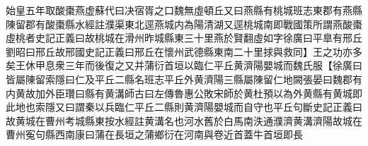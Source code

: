 始皇五年取酸棗燕虚蘇代曰决宿胥之口魏無虛頓丘又曰燕縣有桃城班志東郡有燕縣陳留郡有酸棗縣水經註濮渠東北逕燕城内為陽清湖又逕桃城南即戰國策所謂燕酸棗虛桃者史記正義曰故桃城在滑州昨城縣東三十里燕於賢翻虛如字徐廣曰平臯有邢丘劉昭曰邢丘故邢國史記正義曰邢丘在懷州武德縣東南二十里捄與救同】王之功亦多矣王休甲息衆三年而後復之又并蒲衍首垣以臨仁平丘黄濟陽嬰城而魏氏服【徐廣曰皆屬陳留索隱曰仁及平丘二縣名班志平丘外黄濟陽三縣屬陳留仁地闕張晏曰魏郡有内黄故加外臣瓚曰縣有黄溝師古曰左傳魯惠公敗宋師於黄杜預以為外黄縣有黄城即此地也索隱又曰謂秦以兵臨仁平丘二縣則黄濟陽嬰城而自守也平丘句斷史記正義曰故黄城在曹州考城縣東按水經註黄溝名也河水舊於白馬南泆通濮濟黄溝濟陽故城在曹州寃句縣西南康曰蒲在長垣之蒲鄉衍在河南與卷近首蓋牛首垣即長